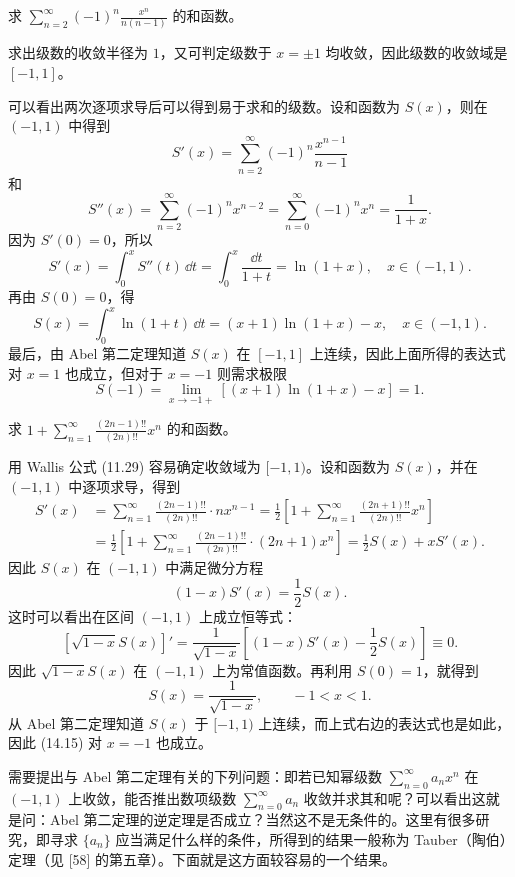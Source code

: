 \begin{xexample}[14.3.4]
求 $\displaystyle\sum_{n=2}^{\infty}(-1)^n\frac{x^n}{n(n-1)}$ 的和函数。
\end{xexample}
\begin{xsolution}
求出级数的收敛半径为 $1$，又可判定级数于 $x=\pm1$ 均收敛，因此级数的收敛域是 $[-1,1]$。

可以看出两次逐项求导后可以得到易于求和的级数。设和函数为 $S(x)$，则在 $(-1,1)$ 中得到
\[
  S'(x)=\sum_{n=2}^{\infty}(-1)^n\frac{x^{n-1}}{n-1}
\]
和
\[
  S''(x)=\sum_{n=2}^{\infty}(-1)^n x^{n-2}
  =\sum_{n=0}^{\infty}(-1)^n x^n=\frac1{1+x}.
\]
因为 $S'(0)=0$，所以
\[
  S'(x)=\int_0^xS''(t)\,\dd t=\int_0^x\frac{\dd t}{1+t}=\ln(1+x),\quad x\in(-1,1).
\]
再由 $S(0)=0$，得
\[
  S(x)=\int_0^x\ln(1+t)\,\dd t=(x+1)\ln(1+x)-x,\quad x\in(-1,1).
\]
最后，由 Abel 第二定理知道 $S(x)$ 在 $[-1,1]$ 上连续，因此上面所得的表达式对 $x=1$ 也成立，但对于 $x=-1$ 则需求极限
\[
  S(-1)=\lim_{x\to-1+}[(x+1)\ln(1+x)-x]=1.
\]
\end{xsolution}

\begin{xexample}[14.3.5]
求 $\displaystyle 1+\sum_{n=1}^{\infty}\frac{(2n-1)!!}{(2n)!!}x^n$ 的和函数。
\end{xexample}
\begin{xsolution}
用 Wallis 公式 (11.29) 容易确定收敛域为 $[-1,1)$。设和函数为 $S(x)$，并在 $(-1,1)$ 中逐项求导，得到
\[
\begin{aligned}
  S'(x)&=\sum_{n=1}^{\infty}\frac{(2n-1)!!}{(2n)!!}\cdot nx^{n-1}
  =\frac12\left[1+\sum_{n=1}^{\infty}\frac{(2n+1)!!}{(2n)!!}x^n\right]\\
  &=\frac12\left[1+\sum_{n=1}^{\infty}\frac{(2n-1)!!}{(2n)!!}\cdot(2n+1)x^n\right]
  =\frac12S(x)+xS'(x).
\end{aligned}
\]
因此 $S(x)$ 在 $(-1,1)$ 中满足微分方程
\[
  (1-x)S'(x)=\frac12S(x).
\]
这时可以看出在区间 $(-1,1)$ 上成立恒等式：
\[
  [\sqrt{1-x}S(x)]'
  =\frac1{\sqrt{1-x}}\left[(1-x)S'(x)-\frac12S(x)\right]\equiv0.
\]
因此 $\sqrt{1-x}S(x)$ 在 $(-1,1)$ 上为常值函数。再利用 $S(0)=1$，就得到
\begin{equation}
  S(x)=\frac1{\sqrt{1-x}},\qquad -1<x<1.
  \tag{14.15}
  \label{eq:14.15}
\end{equation}
从 Abel 第二定理知道 $S(x)$ 于 $[-1,1)$ 上连续，而上式右边的表达式也是如此，因此 (14.15) 对 $x=-1$ 也成立。
\end{xsolution}

需要提出与 Abel 第二定理有关的下列问题：即若已知幂级数 $\displaystyle\sum_{n=0}^{\infty}a_nx^n$ 在 $(-1,1)$ 上收敛，能否推出数项级数 $\displaystyle\sum_{n=0}^{\infty}a_n$ 收敛并求其和呢？可以看出这就是问：Abel 第二定理的逆定理是否成立？当然这不是无条件的。这里有很多研究，即寻求 $\{a_n\}$ 应当满足什么样的条件，所得到的结果一般称为 Tauber（陶伯）定理（见 [58] 的第五章）。下面就是这方面较容易的一个结果。

